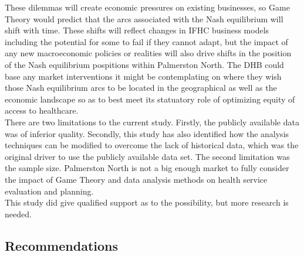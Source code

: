 \documentclass[11pt,a4paper]{article}
\begin{document}
These dilemmas will create economic pressures on existing businesses, so Game Theory would predict that the arcs associated with the Nash equilibrium will shift with time. These shifts will reflect changes in IFHC business models including the potential for some to fail if they cannot adapt, but the impact of any new macroeconomic policies or realities will also drive shifts in the position of the Nash equilibrium pospitions within Palmerston North. The DHB could base any market interventions it might be contemplating on where they wish those Nash equilibrium arcs to be located in the geographical as well as the economic landscape so as to best meet its statuatory role of optimizing equity of access to healthcare.\\


There are two limitations to the current study. Firstly, the publicly available data was of inferior quality. Secondly, this study has also identified how the analysis techniques can be modified to overcome the lack of historical data, which was the original driver to use the publicly available data set. The second limitation was the sample size. Palmerston North is not a big enough market to fully consider the impact of Game Theory and data analysis methods on health service evaluation and planning.\\


This study did give qualified support as to the possibility, but more research is needed.\\


\subsection{Recommendations}
 
\end{document}
